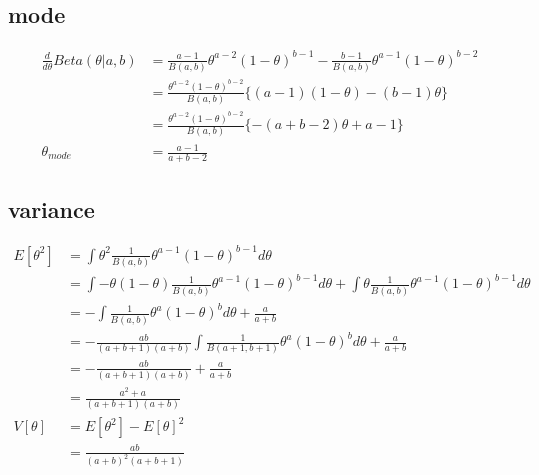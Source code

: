 \documentclass{jsarticle}
\begin{document}
\subsection*{mode}
\begin{align}
\frac{d}{d\theta}Beta(\theta|a,b) & = \frac{a-1}{B(a,b)}\theta^{a-2}(1-\theta)^{b-1}-\frac{b-1}{B(a,b)}\theta^{a-1}(1-\theta)^{b-2}\\
& = \frac{\theta^{a-2}(1-\theta)^{b-2}}{B(a,b)}\{(a-1)(1-\theta) - (b-1)\theta \} \\
& = \frac{\theta^{a-2}(1-\theta)^{b-2}}{B(a,b)}\{-(a + b - 2)\theta + a - 1 \}\\
\theta_{mode} & = \frac{a-1}{a+b-2}
\end{align}
\subsection*{variance}
\begin{align}
E[\theta^2] & = \int \theta^2\frac{1}{B(a,b)}\theta^{a-1}(1-\theta)^{b-1}d\theta\\
& = \int-\theta(1-\theta)\frac{1}{B(a,b)}\theta^{a-1}(1-\theta)^{b-1}d\theta + \int \theta \frac{1}{B(a,b)}\theta^{a-1}(1-\theta)^{b-1}d\theta\\
& = -\int\frac{1}{B(a,b)}\theta^a(1-\theta)^bd\theta + \frac{a}{a+b}\\
& = -\frac{ab}{(a+b+1)(a+b)}\int\frac{1}{B(a+1,b+1)}\theta^a(1-\theta)^bd\theta + \frac{a}{a+b}\\
& = -\frac{ab}{(a+b+1)(a+b)} + \frac{a}{a+b}\\
& = \frac{a^2+a}{(a+b+1)(a+b)}\\
V[\theta] & = E[\theta^2] - E[\theta]^2 \\
& = \frac{ab}{(a+b)^2(a+b+1)}
\end{align}
\end{document}
